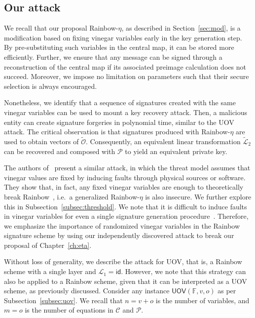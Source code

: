 \documentclass[english]{ufsc-thesis-rn46-2019/ufsc-thesis-rn46-2019}
\theoremstyle{definition}
\begin{document}
\subsection{Our attack}\label{subsec:etaks}

We recall that our proposal Rainbow-$\eta$, as described in
Section~\ref{sec:mod}, is a modification based on fixing vinegar variables
early in the key generation step. By pre-substituting such variables in the
central map, it can be stored more efficiently. Further, we ensure that any
message can be signed through a reconstruction of the central map if its
associated preimage calculation does not succeed. Moreover, we impose no
limitation on parameters such that their secure selection is always encouraged.

Nonetheless, we identify that a sequence of signatures created with the same
vinegar variables can be used to mount a key recovery attack. Then, a malicious
entity can create signature forgeries in polynomial time, similar to the UOV
attack. The critical observation is that signatures produced with
Rainbow-$\eta$ are used to obtain vectors of
$\widetilde{\mathcal{O}}$. Consequently, an equivalent linear transformation
$\widetilde{\mathcal{L}}_{2}$ can be recovered and composed with $\mathcal{P}$
to yield an equivalent private key.

The authors of~\cite{Shim:202002} present a similar attack, in which the threat
model assumes that vinegar values are fixed by inducing faults through physical
sources or software. They show that, in fact, any fixed vinegar variables are
enough to theoretically break Rainbow~\cite[Thm.~4]{Shim:202002},
i.e.\ a generalized Rainbow-$\eta$ is also insecure. We further explore this in
Subsection~\ref{subsec:threshold}. We note that it is difficult to induce
faults in vinegar variables for even a single signature generation
procedure~\cite{Mus:202011}. Therefore, we emphasize the importance of
randomized vinegar variables in the Rainbow signature scheme by using our
independently discovered attack to break our proposal of Chapter~\ref{ch:eta}.

Without loss of generality, we describe the attack for UOV, that is, a Rainbow
scheme with a single layer and $\mathcal{L}_{1} = \textsf{id}$. However, we
note that this strategy can also be applied to a Rainbow scheme, given that it
can be interpreted as a UOV scheme, as previously discussed. Consider any
instance $\textsf{UOV}(\mathbb{F}, v, o)$ as per
Subsection~\ref{subsec:uov}. We recall that $n = v + o$ is the number of
variables, and $m = o$ is the number of equations in $\mathcal{C}$ and
$\mathcal{P}$.
\end{document}
